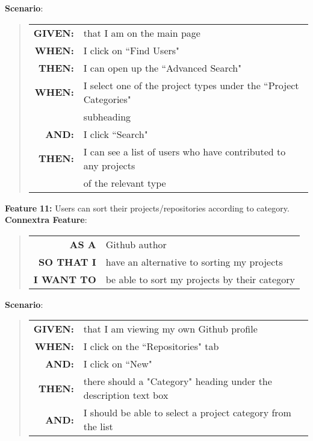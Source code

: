 \documentclass[12pt]{article}
\newcommand{\Feature}[1]{ 
   \noindent \textbf{Feature} #1
}
\newcommand{\GivenSc} {
	\noindent \textbf{GIVEN:}
	}
\newcommand{\WhenSc} {
	\noindent \textbf{WHEN:}
	}
\newcommand{\AndSc} {
	\noindent \textbf{AND:}
	}
\newcommand{\ThenSc} {
	\noindent \textbf{THEN:}
	}
\begin{document}
\begin{framed}
\noindent \textbf{Scenario}:
\begin{quote}
\begin{tabular}{rl}
\GivenSc & that I am on the main page\\
\WhenSc  & I click on ``Find Users"\\
\ThenSc  & I can open up the ``Advanced Search"\\
\WhenSc  & I select one of the project types under the ``Project Categories"\\
         & subheading\\ 
\AndSc   & I click ``Search"\\
\ThenSc  & I can see a list of users who have contributed to any projects \\
         & of the relevant type
\end{tabular}
\end{quote}

\pagebreak

\noindent \Feature{\textbf{11:} Users can sort their projects/repositories according to category.}\\[0.2cm]

\noindent \textbf{Connextra Feature}:
\begin{quote}
\begin{tabular}{rl}
\textbf{AS A}      & \textsf{Github} author\\
\textbf{SO THAT I} & have an alternative to sorting my projects\\
\textbf{I WANT TO} & be able to sort my projects by their category \\
\end{tabular}
\end{quote}


\noindent \textbf{Scenario}:
\begin{quote}
\begin{tabular}{rl}
\GivenSc & that I am viewing my own \textsf{Github} profile\\
\WhenSc  & I click on the ``Repositories" tab\\
\AndSc   & I click on ``New"\\
\ThenSc  & there should a "Category" heading under the description text box\\
\AndSc   & I should be able to select a project category from the list
\end{tabular}
\end{quote}


\end{framed}
\end{document}
